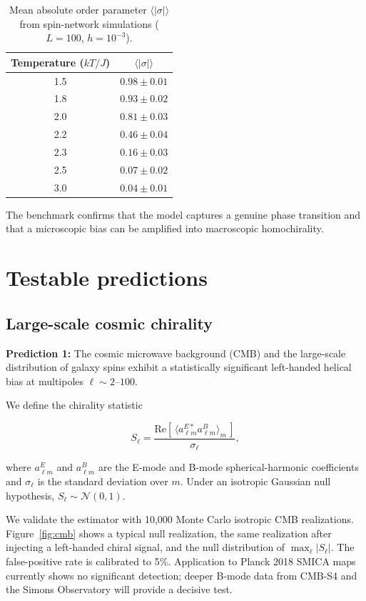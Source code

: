 \documentclass[twocolumn,11pt,a4paper]{article}
\begin{document}
\begin{table}[t]
\centering
\caption{Mean absolute order parameter $\langle|\sigma|\rangle$ from spin-network simulations ($L=100$, $h=10^{-3}$).}
\label{tab:ising}
\begin{tabular}{@{}cc@{}}
\toprule
Temperature ($kT/J$) & $\langle|\sigma|\rangle$ \\
\midrule
1.5 & $0.98 \pm 0.01$ \\
1.8 & $0.93 \pm 0.02$ \\
2.0 & $0.81 \pm 0.03$ \\
2.2 & $0.46 \pm 0.04$ \\
2.3 & $0.16 \pm 0.03$ \\
2.5 & $0.07 \pm 0.02$ \\
3.0 & $0.04 \pm 0.01$ \\
\bottomrule
\end{tabular}
\end{table}

The benchmark confirms that the model captures a genuine phase transition and that a microscopic bias can be amplified into macroscopic homochirality.

\section{Testable predictions}
\label{sec:predictions}

\subsection{Large-scale cosmic chirality}

\textbf{Prediction 1:} The cosmic microwave background (CMB) and the large-scale distribution of galaxy spins exhibit a statistically significant left-handed helical bias at multipoles $\ell \sim 2$--$100$.

We define the chirality statistic

\begin{equation}
S_\ell = \frac{\mathrm{Re}\left[\,\langle a_{\ell m}^{E*} a_{\ell m}^{B} \rangle_m\,\right]}{\sigma_\ell},
\label{eq:sl}
\end{equation}

where $a_{\ell m}^E$ and $a_{\ell m}^B$ are the E-mode and B-mode spherical-harmonic coefficients and $\sigma_\ell$ is the standard deviation over $m$. Under an isotropic Gaussian null hypothesis, $S_\ell \sim \mathcal{N}(0,1)$.

We validate the estimator with 10,000 Monte Carlo isotropic CMB realizations. Figure~\ref{fig:cmb} shows a typical null realization, the same realization after injecting a left-handed chiral signal, and the null distribution of $\max_\ell |S_\ell|$. The false-positive rate is calibrated to 5\%. Application to Planck 2018 SMICA maps~\cite{planck2020} currently shows no significant detection; deeper B-mode data from CMB-S4 and the Simons Observatory will provide a decisive test.
\end{document}
